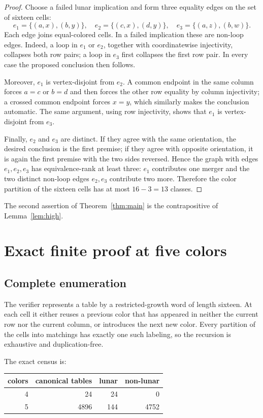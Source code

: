 \documentclass[11pt]{article}
\begin{document}
\begin{proof}
Choose a failed lunar implication and form three equality edges on the set of
sixteen cells:
\[
 e_1=\{(a,x),(b,y)\},\quad
 e_2=\{(c,x),(d,y)\},\quad
 e_3=\{(a,z),(b,w)\}.
\]
Each edge joins equal-colored cells.  In a failed implication these are
non-loop edges.  Indeed, a loop in $e_1$ or $e_2$, together with coordinatewise
injectivity, collapses both row pairs; a loop in $e_3$ first collapses the
first row pair.  In every case the proposed conclusion then follows.

Moreover, $e_1$ is vertex-disjoint from $e_2$.  A common endpoint in the same
column forces $a=c$ or $b=d$ and then forces the other row equality by column
injectivity; a crossed common endpoint forces $x=y$, which similarly makes the
conclusion automatic.  The same argument, using row injectivity, shows that
$e_1$ is vertex-disjoint from $e_3$.

Finally, $e_2$ and $e_3$ are distinct.  If they agree with the same
orientation, the desired conclusion is the first premise; if they agree with
opposite orientation, it is again the first premise with the two sides
reversed.  Hence the graph with edges $e_1,e_2,e_3$ has equivalence-rank at
least three: $e_1$ contributes one merger and the two distinct non-loop edges
$e_2,e_3$ contribute two more.  Therefore the color partition of the sixteen
cells has at most $16-3=13$ classes.
\end{proof}

The second assertion of Theorem~\ref{thm:main} is the contrapositive of
Lemma~\ref{lem:high}.

\section{Exact finite proof at five colors}

\subsection{Complete enumeration}

The verifier represents a table by a restricted-growth word of length sixteen.
At each cell it either reuses a previous color that has appeared in neither
the current row nor the current column, or introduces the next new color.
Every partition of the cells into matchings has exactly one such labeling, so
the recursion is exhaustive and duplication-free.

The exact census is:
\begin{center}
\begin{tabular}{@{}rrrr@{}}
\toprule
colors & canonical tables & lunar & non-lunar\\
\midrule
4 & 24 & 24 & 0\\
5 & 4896 & 144 & 4752\\
\bottomrule
\end{tabular}
\end{center}
\end{document}
